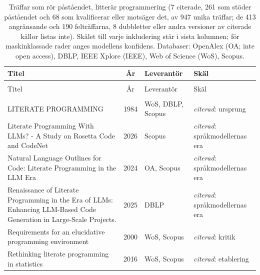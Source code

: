 
\begingroup\footnotesize
\begin{longtable}{@{}%
  >{\raggedright\arraybackslash}p{}c%
  >{\raggedright\arraybackslash}p{}%
  >{\raggedright\arraybackslash}p{}@{}}
\caption{Träffar som rör påståendet, litterär programmering (7 citerade, 261 som stöder påståendet och 68 som kvalificerar eller motsäger det, av 947 unika träffar; de 413 angränsande och 190 felträffarna, 8 dubbletter eller andra versioner av citerade källor listas inte). Skälet till varje inkludering står i sista kolumnen; för maskinklassade rader anges modellens konfidens. Databaser: OpenAlex (OA; inte open access), DBLP, IEEE Xplore (IEEE), Web of Science (WoS), Scopus.}\label{tab:sok-litprog}\\
\toprule
Titel & År & Leverantör & Skäl \\
\midrule
\endfirsthead
\multicolumn{4}{@{}l}{\emph{\tablename~\thetable{} (forts.)}}\\
\toprule
Titel & År & Leverantör & Skäl \\
\midrule
\endhead
\midrule \multicolumn{4}{r@{}}{\emph{forts.\ på nästa sida}}\\
\endfoot
\bottomrule
\endlastfoot
LITERATE PROGRAMMING & 1984 & WoS, DBLP, Scopus & \emph{citerad}: ursprung \\
Literate Programming With LLMs? - A Study on Rosetta Code and CodeNet & 2026 & Scopus & \emph{citerad}: språkmodellernas era \\
Natural Language Outlines for Code: Literate Programming in the LLM Era & 2024 & OA, Scopus & \emph{citerad}: språkmodellernas era \\
Renaissance of Literate Programming in the Era of LLMs: Enhancing LLM-Based Code Generation in Large-Scale Projects. & 2025 & DBLP & \emph{citerad}: språkmodellernas era \\
Requirements for an elucidative programming environment & 2000 & WoS, Scopus & \emph{citerad}: kritik \\
Rethinking literate programming in statistics & 2016 & WoS, Scopus & \emph{citerad}: etablering \\

\end{longtable}
